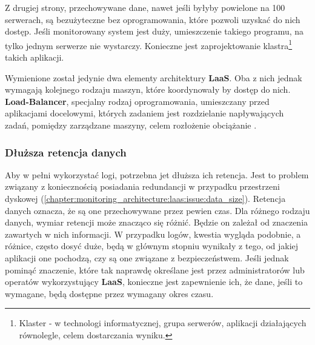     Z drugiej strony, przechowywane dane, nawet jeśli byłyby powielone na 100 serwerach, są bezużyteczne bez oprogramowania, które
    pozwoli uzyskać do nich dostęp. Jeśli monitorowany system jest duży, umieszczenie takiego programu, na tylko jednym serwerze nie wystarczy.
    Konieczne jest zaprojektowanie klastra\footnote{Klaster - w technologi informatycznej, grupa serwerów, aplikacji działających równolegle, celem dostarczania wyniku.} takich aplikacji. 
    
    Wymienione został jedynie dwa elementy architektury \textbf{LaaS}. Oba z nich jednak wymagają kolejnego rodzaju maszyn, które koordynowały by dostęp do nich.
    \textbf{Load-Balancer}, specjalny rodzaj oprogramowania, umieszczany przed aplikacjami docelowymi, których zadaniem jest 
    rozdzielanie napływających zadań, pomiędzy zarządzane maszyny, celem rozłożenie obciążanie \cite{log_management_to_build_or_to_buy}.
    
    \subsubsection{Dłuższa retencja danych}
    Aby w pełni wykorzystać logi, potrzebna jet dłuższa ich retencja. Jest to problem związany z koniecznością posiadania
    redundancji w przypadku przestrzeni dyskowej (\ref{chapter:monitoring_architecture:laas:issue:data_size}). 
    Retencja danych oznacza, że są one przechowywane przez pewien czas. Dla różnego rodzaju danych, wymiar retencji
    może znacząco się różnić. Będzie on zależał od znaczenia zawartych w nich informacji. W przypadku logów,
    kwestia wygląda podobnie, a różnice, często dosyć duże, będą w głównym stopniu wynikały z tego, od jakiej
    aplikacji one pochodzą, czy są one związane z bezpieczeństwem. Jeśli jednak pominąć znaczenie, które 
    tak naprawdę określane jest przez administratorów lub operatów wykorzystujący \textbf{LaaS}, konieczne jest
    zapewnienie ich, że dane, jeśli to wymagane, będą dostępne przez wymagany okres czasu. 
